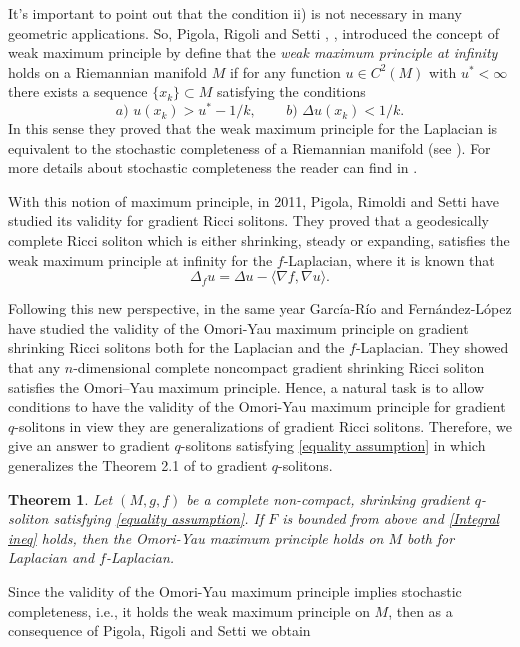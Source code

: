 \documentclass{amsart}
\theoremstyle{plain}
\newtheorem{theorem}{\bf Theorem}[section]
\numberwithin{equation}{section}
\begin{document}
It's important to point out that the condition ii) is not necessary in many geometric applications. So,  Pigola, Rigoli and Setti  \cite{prs-pams}, \cite{PRS-Memoirs}, introduced the concept of weak maximum principle by define that the {\em weak maximum
principle at infinity} holds on a Riemannian manifold $M$ if for any function $u\in C^{2}(M)$ with $u^{\ast}< \infty$ there exists a sequence $\{x_k\}\subset M$
satisfying the conditions \[a)\,\, u(x_k)> u^{\ast}-1/k, \,\,\,\;\,\,\,\,\,\,\,\,b)\,\, \Delta u (x_k) < 1/k. \]
In this sense they proved that the weak maximum principle for
 the Laplacian is equivalent to the stochastic completeness of a Riemannian manifold (see \cite{prs-pams}). For more details about stochastic completeness the reader can find in \cite{grigoryan}. 
 
 With this notion of maximum principle, in 2011, Pigola, Rimoldi and Setti \cite{PRS} have studied its validity for gradient Ricci solitons. They proved that a geodesically complete Ricci soliton which is either
shrinking, steady or expanding, satisfies the weak maximum principle at infinity for the $f$-Laplacian, where it is known that 
$$\Delta_fu=\Delta u-\langle\nabla f,\nabla u\rangle.$$

 Following this new perspective, in the same year García-Río and Fernández-López \cite{GR} have studied the validity of the Omori-Yau maximum principle on gradient shrinking Ricci solitons both for the Laplacian
and the $f$-Laplacian. They showed that any $n$-dimensional complete noncompact gradient shrinking Ricci soliton satisfies the Omori–Yau maximum principle. Hence, a natural task is to allow conditions to have the validity of the Omori-Yau maximum principle for gradient $q$-solitons in view they are generalizations of gradient Ricci solitons. Therefore, we give an answer to gradient $q$-solitons satisfying \eqref{equality assumption} in which generalizes the Theorem 2.1 of \cite{GR} to gradient $q$-solitons.

\begin{theorem}\label{thm07}
    Let $(M,g,f)$ be a complete non-compact, shrinking gradient $q$-soliton satisfying \eqref{equality assumption}. If $F$ is bounded from above and \eqref{Integral ineq} holds, then the Omori-Yau maximum principle holds on $M$ both for Laplacian and $f$-Laplacian.
\end{theorem}

Since the validity of the Omori-Yau maximum principle implies stochastic completeness, i.e., it holds the weak maximum principle on $M$, then as a consequence of  Pigola, Rigoli and Setti \cite{PRS-Memoirs} we obtain
\end{document}
